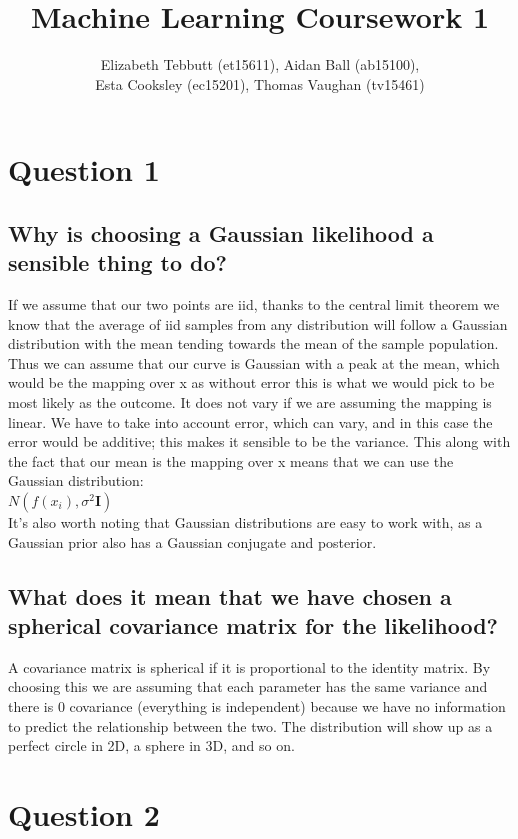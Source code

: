 \documentclass[a4paper, 9pt]{article}
\title{Machine Learning Coursework 1}
\author{Elizabeth Tebbutt (et15611), Aidan Ball (ab15100), \\
Esta Cooksley (ec15201), Thomas Vaughan (tv15461)}
\begin{document}
\maketitle
\section*{Question 1}
\subsection*{Why is choosing a Gaussian likelihood a sensible thing to do?}
If we assume that our two points are iid, thanks to the central limit theorem we know that the average of iid samples from any distribution will follow a Gaussian distribution with the mean tending towards the mean of the sample population. Thus we can assume that our curve is Gaussian with a peak at the mean, which would be the mapping over x as without error this is what we would pick to be most likely as the outcome. It does not vary if we are assuming the mapping is linear. We have to take into account error, which can vary, and in this case the error would be additive; this makes it sensible to be the variance. This along with the fact that our mean is the mapping over x means that we can use the Gaussian distribution: \\

\( N(f(x_i), \sigma^2 \mathbf{I} ) \) \\

It's also worth noting that Gaussian distributions are easy to work with, as a Gaussian prior also has a Gaussian conjugate and posterior.
\subsection*{What does it mean that we have chosen a spherical covariance matrix for the likelihood?}
A covariance matrix is spherical if it is proportional to the identity matrix. By choosing this we are assuming that each parameter has the same variance and there is 0 covariance (everything is independent) because we have no information to predict the relationship between the two. The distribution will show up as a perfect circle in 2D, a sphere in 3D, and so on.

\section*{Question 2}
\end{document}
